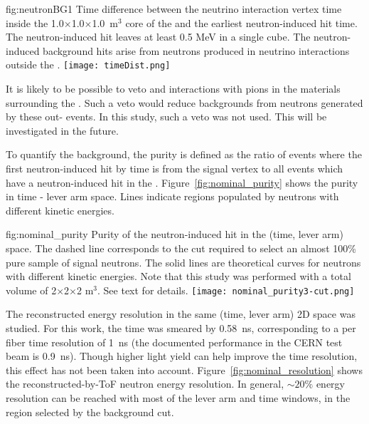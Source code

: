 \begin{dunefigure}{fig:neutronBG1}
{Time difference between the neutrino interaction vertex time inside the 1.0$\times$1.0$\times$1.0~m$^{3}$  core of the  and the earliest neutron-induced hit time. The neutron-induced hit leaves at least 0.5 MeV in a single cube. The neutron-induced background hits arise from neutrons produced in neutrino interactions outside the .}
  \texttt{[image: timeDist.png]}
\end{dunefigure}

It is likely to be possible to veto   and  interactions with pions in the materials surrounding the .  Such a veto would reduce backgrounds from neutrons generated by these out- events.  In this study, such a veto was not used. This will be investigated in the future.

To quantify the background, the purity is defined as the ratio of events where the first neutron-induced hit by time is from the signal vertex to all events which have a neutron-induced hit in the . 
Figure~\ref{fig:nominal_purity} shows the purity in time - lever arm space. Lines indicate regions populated by neutrons with different kinetic energies.

\begin{dunefigure}{fig:nominal_purity}
{Purity of the neutron-induced hit in the (time, lever arm) space.
The dashed line corresponds to the cut required to select an almost 100\% pure sample of signal neutrons. The solid lines are theoretical curves for neutrons with different kinetic energies.
Note that this study was performed with a total volume of 2$\times$2$\times$2 m$^3$.
See text for details.}
  \texttt{[image: nominal\_purity3-cut.png]}
\end{dunefigure}

The reconstructed energy resolution in the same (time, lever arm) 2D space was studied. For this work, the time was smeared by 0.58~ns, corresponding to a per fiber time resolution of 1~ns (the documented performance in the CERN test beam is 0.9~ns).
Though higher light yield can help improve the time resolution, this effect has not been taken into account. Figure~\ref{fig:nominal_resolution} shows the reconstructed-by-ToF neutron energy resolution. In general, $\sim 20 \%$ energy resolution can be reached with most of the lever arm and time windows, 
in the region selected by the background cut. \\

